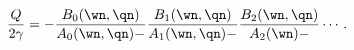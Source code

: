 \begin{equation}
{Q\over 2\gamma} = - 
{B_0(\wn,\qn)\over A_0(\wn,\qn)-}{B_1(\wn,\qn)\over A_1(\wn,\qn)-}
{B_2(\wn,\qn)\over A_2(\wn)-}\cdots\,.
\label{seigen}
\end{equation}

